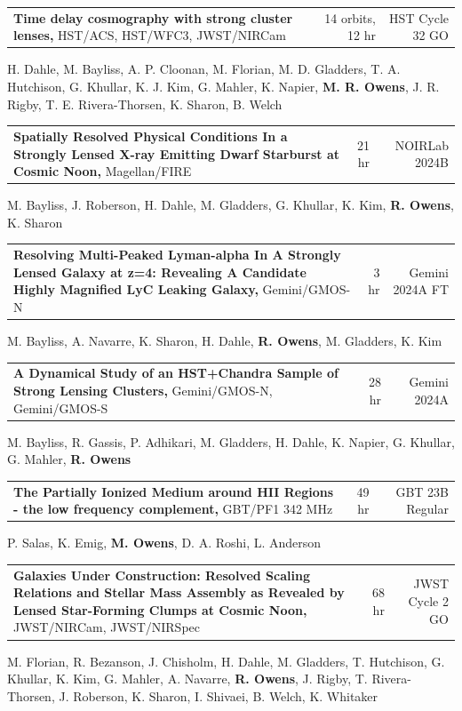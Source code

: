 \documentclass[11pt]{article}
\makeatletter
\newenvironment{cvblock}
  {\par\nointerlineskip\noindent\ignorespaces}
  {\par\nointerlineskip}
\newcommand{\proposal}[5]{
    {
    \noindent
    \begin{tabularx}{\textwidth}{@{} X rr @{}}
        \textbf{#1,} {\color{gray}\fontseries{normal}\selectfont #2}
        & #3 & #4 \\
    \end{tabularx}
    \addvspace{0.1cm}
    \noindent #5
    \addvspace{0.3cm}
    }
}
\makeatother
\begin{document}
\proposal{Time delay cosmography with strong cluster lenses}{HST/ACS, HST/WFC3, JWST/NIRCam}{14 orbits, 12 hr}{HST Cycle 32 GO}{H. Dahle, M. Bayliss, A. P. Cloonan, M. Florian, M. D. Gladders, T. A. Hutchison, G. Khullar, K. J. Kim, G. Mahler, K. Napier, \textbf{M. R. Owens}, J. R. Rigby, T. E. Rivera-Thorsen, K. Sharon, B. Welch}

\proposal{Spatially Resolved Physical Conditions In a Strongly Lensed X-ray Emitting Dwarf Starburst at Cosmic Noon}{Magellan/FIRE}{21 hr}{NOIRLab 2024B}{M. Bayliss, J. Roberson, H. Dahle, M. Gladders, G. Khullar, K. Kim, \textbf{R. Owens}, K. Sharon}

\proposal{Resolving Multi-Peaked Lyman-alpha In A Strongly Lensed Galaxy at z=4: Revealing A Candidate Highly Magnified LyC Leaking Galaxy}{Gemini/GMOS-N}{3 hr}{Gemini 2024A FT}{M. Bayliss, A. Navarre, K. Sharon, H. Dahle, \textbf{R. Owens}, M. Gladders, K. Kim}

\proposal{A Dynamical Study of an HST+Chandra Sample of
Strong Lensing Clusters}{Gemini/GMOS-N, Gemini/GMOS-S}{28 hr}{Gemini 2024A}{M. Bayliss, R. Gassis, P. Adhikari, M. Gladders, H. Dahle, K. Napier, G. Khullar, G. Mahler, \textbf{R. Owens}}

\proposal{The Partially Ionized Medium around HII Regions - the low frequency complement}{GBT/PF1 342 MHz}{49 hr}{GBT 23B Regular}{P. Salas, K. Emig, \textbf{M. Owens}, D. A. Roshi, L. Anderson}

\proposal{Galaxies Under Construction: Resolved Scaling Relations and Stellar Mass Assembly as Revealed by Lensed Star-Forming Clumps at Cosmic Noon}{JWST/NIRCam, JWST/NIRSpec}{68 hr}{JWST Cycle 2 GO}{M. Florian, R. Bezanson, J. Chisholm, H. Dahle, M. Gladders, T. Hutchison, G. Khullar, K. Kim, G. Mahler, A. Navarre, \textbf{R. Owens}, J. Rigby, T. Rivera-Thorsen, J. Roberson, K. Sharon, I. Shivaei, B. Welch, K. Whitaker}


\end{document}
